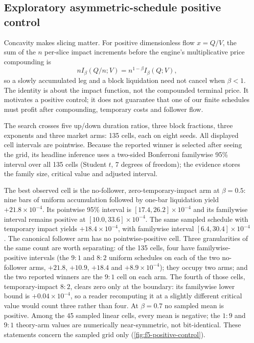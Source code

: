 \subsection{Exploratory asymmetric-schedule positive control}\label{sec:f5-positive-control}

Concavity makes slicing matter. For positive dimensionless flow $x=Q/V$, the sum of the $n$ per-slice impact increments before the engine's multiplicative price compounding is
\[
n I_\beta(Q/n;V)=n^{1-\beta} I_\beta(Q;V),
\]
so a slowly accumulated leg and a block liquidation need not cancel when $\beta<1$. The identity is about the impact function, not the compounded terminal price. It motivates a positive control; it does not guarantee that one of our finite schedules must profit after compounding, temporary costs and follower flow.

The search crosses five up/down duration ratios, three block fractions, three exponents and three market arms: 135 cells, each on eight seeds. All displayed cell intervals are pointwise. Because the reported winner is selected after seeing the grid, its headline inference uses a two-sided Bonferroni familywise 95\% interval over all 135 cells (Student $t$, 7 degrees of freedom); the evidence stores the family size, critical value and adjusted interval.

The best observed cell is the no-follower, zero-temporary-impact arm at $\beta=0.5$: nine bars of uniform accumulation followed by one-bar liquidation yield $+21.8\times10^{-4}$. Its pointwise 95\% interval is $[17.4,26.2]\times10^{-4}$ and its familywise interval remains positive at $[10.0,33.6]\times10^{-4}$. The same sampled schedule with temporary impact yields $+18.4\times10^{-4}$, with familywise interval $[6.4,30.4]\times10^{-4}$. The canonical follower arm has no pointwise-positive cell. Three granularities of the same count are worth separating: of the 135 cells, four have familywise-positive intervals (the $9{:}1$ and $8{:}2$ uniform schedules on each of the two no-follower arms, $+21.8$, $+10.9$, $+18.4$ and $+8.9\times10^{-4}$); they occupy two arms; and the two reported winners are the $9{:}1$ cell on each arm. The fourth of those cells, temporary-impact $8{:}2$, clears zero only at the boundary: its familywise lower bound is $+0.04\times10^{-4}$, so a reader recomputing it at a slightly different critical value would count three rather than four. At $\beta=0.7$ no sampled mean is positive. Among the 45 sampled linear cells, every mean is negative; the $1{:}9$ and $9{:}1$ theory-arm values are numerically near-symmetric, not bit-identical. These statements concern the sampled grid only (\cref{fig:f5-positive-control}).


